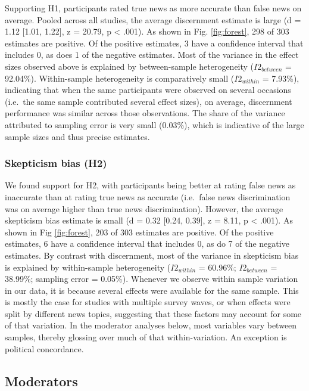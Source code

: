 \documentclass[
  doc,floatsintext]{apa6}
\begin{document}
Supporting H1, participants rated true news as more accurate than false news on average. Pooled across all studies, the average discernment estimate is large (d = 1.12 {[}1.01, 1.22{]}, z = 20.79, p \textless{} .001). As shown in Fig. \ref{fig:forest}, 298 of 303 estimates are positive. Of the positive estimates, 3 have a confidence interval that includes 0, as does 1 of the negative estimates. Most of the variance in the effect sizes observed above is explained by between-sample heterogeneity (\(I2_{between}\) = 92.04\%). Within-sample heterogeneity is comparatively small (\(I2_{within}\) = 7.93\%), indicating that when the same participants were observed on several occasions (i.e.~the same sample contributed several effect sizes), on average, discernment performance was similar across those observations. The share of the variance attributed to sampling error is very small (0.03\%), which is indicative of the large sample sizes and thus precise estimates.

\subsubsection{Skepticism bias (H2)}\label{skepticism-bias-h2}

We found support for H2, with participants being better at rating false news as inaccurate than at rating true news as accurate (i.e.~false news discrimination was on average higher than true news discrimination). However, the average skepticism bias estimate is small (d = 0.32 {[}0.24, 0.39{]}, z = 8.11, p \textless{} .001). As shown in Fig \ref{fig:forest}, 203 of 303 estimates are positive. Of the positive estimates, 6 have a confidence interval that includes 0, as do 7 of the negative estimates. By contrast with discernment, most of the variance in skepticism bias is explained by within-sample heterogeneity (\(I2_{within}\) = 60.96\%; \(I2_{between}\) = 38.99\%; sampling error = 0.05\%). Whenever we observe within sample variation in our data, it is because several effects were available for the same sample. This is mostly the case for studies with multiple survey waves, or when effects were split by different news topics, suggesting that these factors may account for some of that variation. In the moderator analyses below, most variables vary between samples, thereby glossing over much of that within-variation. An exception is political concordance.

\subsection{Moderators}\label{moderators}
\end{document}
